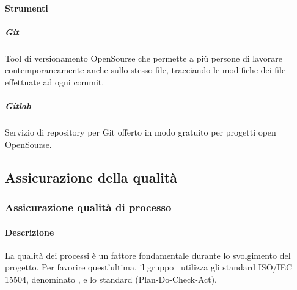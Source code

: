 \documentclass[../NormeDiProgetto_v4.0.0.tex]{subfiles}
\begin{document}
				\paragraph{Strumenti}
					\subparagraph{Git}
						Tool di versionamento OpenSourse che permette a più persone di lavorare contemporaneamente anche sullo stesso file, tracciando le modifiche dei file effettuate ad ogni commit.
					\subparagraph{Gitlab}
						Servizio di repository per Git offerto in modo gratuito per progetti open OpenSourse.

		\subsection{Assicurazione della qualità}
			\subsubsection{Assicurazione qualità di processo}
			\paragraph{Descrizione}
			La qualità dei processi è un fattore fondamentale durante lo svolgimento del progetto. Per favorire quest'ultima, il gruppo \kpanic\ utilizza gli standard ISO/IEC 15504, denominato , e lo standard  (Plan-Do-Check-Act).
\end{document}
